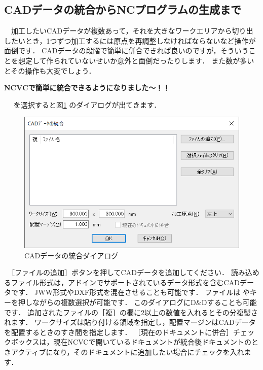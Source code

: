 

\subsection{CADデータの統合からNCプログラムの生成まで}
　加工したいCADデータが複数あって，それを大きなワークエリアから切り出したいとき，1つずつ加工するには原点を再調整しなければならないなど操作が面倒です．
CADデータの段階で簡単に併合できれば良いのですが，そういうことを想定して作られていないせいか意外と面倒だったりします．
また数が多いとその操作も大変でしょう．
\begin{center}
\textbf{NCVCで簡単に統合できるようになりました～！！}
\end{center}
　 を選択すると図\ref{fig:bind.png} のダイアログが出てきます．

\begin{figure}[H]
\centering
\includegraphics[scale=0.7]{No1/fig/bind.png}
\caption{CADデータの統合ダイアログ}
\label{fig:bind.png}
\end{figure}

　［ファイルの追加］ボタンを押してCADデータを追加してください．
読み込めるファイル形式は，アドインでサポートされているデータ形式を含むCADデータです．
JWW形式やDXF形式を混在させることも可能です．
ファイルは やキーを押しながらの複数選択が可能です．
このダイアログにD\&Dすることも可能です．
追加されたファイルの［複］の欄に2以上の数値を入れるとその分複製されます．
ワークサイズは貼り付ける領域を指定し，配置マージンはCADデータを配置するときのすき間を指定します．
［現在のドキュメントに併合］チェックボックスは，現在NCVCで開いているドキュメントが統合後ドキュメントのときアクティブになり，そのドキュメントに追加したい場合にチェックを入れます．

